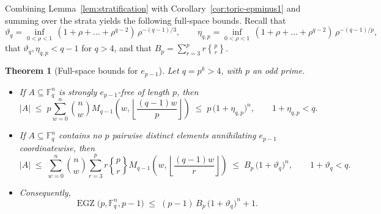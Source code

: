 \documentclass[10pt,a4paper]{amsart}
\newtheorem{theorem}{Theorem}[section]
\theoremstyle{definition}
\newcommand{\F}{\mathbb F}
\newcommand{\EGZ}{\operatorname{EGZ}}
\newcommand{\1}{\mathbf 1}
\newcommand{\StirlingTwo}[2]{\genfrac\{\}{0pt}{}{#1}{#2}}
\begin{document}
Combining Lemma~\ref{lem:stratification} with Corollary~\ref{cor:toric-epminus1} and
summing over the strata yields the following full-space bounds. Recall that
\[
\vartheta_q=\inf_{0<\rho<1}\,(1+\rho+\dots+\rho^{q-2})\,\rho^{-(q-1)/3},
\qquad
\eta_{q,p}=\inf_{0<\rho<1}\,(1+\rho+\dots+\rho^{q-2})\,\rho^{-(q-1)/p},
\]
that $\vartheta_q,\eta_{q,p}<q-1$ for $q>4$, and that
$B_p=\sum_{r=3}^{p} r\StirlingTwo{p}{r}$.

\begin{theorem}[Full-space bounds for $e_{p-1}$]\label{thm:fullspace}
Let $q=p^k>4$, with $p$ an odd prime.
\begin{itemize}
\item[(i)] If $A\subseteq\F_q^n$ is strongly $e_{p-1}$-free of length $p$,
then
\[
|A| \;\leq\; p\sum_{w=0}^{n}\binom{n}{w}
M_{q-1}\!\left(w,\left\lfloor\frac{(q-1)w}{p}\right\rfloor\right)
\;\leq\; p\,\bigl(1+\eta_{q,p}\bigr)^{n},
\qquad 1+\eta_{q,p}<q.
\]
\item[(ii)] If $A\subseteq\F_q^n$ contains no $p$ pairwise distinct elements
annihilating $e_{p-1}$ coordinatewise, then
\[
|A| \;\leq\; \sum_{w=0}^{n}\binom{n}{w}\sum_{r=3}^{p} r\StirlingTwo{p}{r}
M_{q-1}\!\left(w,\left\lfloor\frac{(q-1)w}{r}\right\rfloor\right)
\;\leq\; B_p\,\bigl(1+\vartheta_q\bigr)^{n},
\qquad 1+\vartheta_q<q.
\]
\item[(iii)] Consequently,
\[
\EGZ\bigl(p,\F_q^n,p-1\bigr) \;\leq\; (p-1)\,B_p\,\bigl(1+\vartheta_q\bigr)^{n}+1.
\]
\end{itemize}
\end{theorem}
\end{document}
